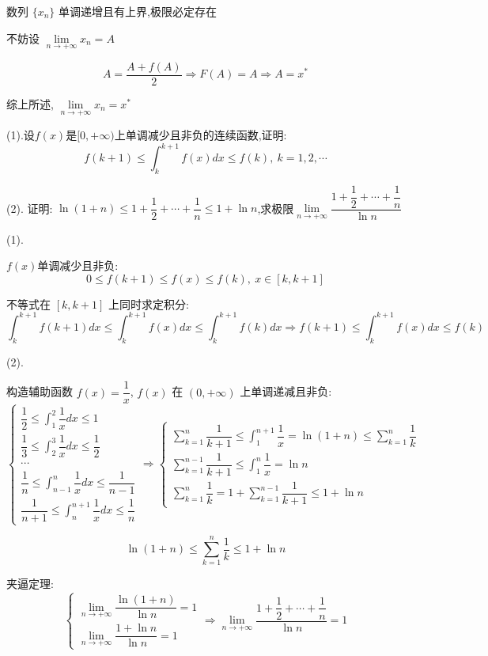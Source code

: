\begin{solution}
	数列 $\{x_{n}\}$ 单调递增且有上界,极限必定存在
	
	不妨设 $\lim\limits_{n\to +\infty}x_{n} = A$
	
	$$A=\dfrac{A+f(A)}{2}\Rightarrow F(A)=A\Rightarrow A=x^{*}$$
	
	综上所述, $\lim\limits_{n\to+\infty}x_{n}=x^{*}$
\end{solution}
\begin{proposition}
(1).设$f(x)$是$[0,+\infty)$上单调减少且非负的连续函数,证明:  $$f(k+1)\leq \int_{k}^{k+1}f(x)dx\leq f(k),\ k=1,2,\cdots$$

(2). 证明:  $\ln(1+n)\leq 1+\dfrac{1}{2}+\cdots+\dfrac{1}{n}\leq 1+\ln n$,求极限$\lim\limits_{n\to+\infty}\dfrac{1+\dfrac{1}{2}+\cdots+\dfrac{1}{n}}{\ln n}$

\end{proposition}
\begin{solution}
	
	(1). 
	
	$f(x)$单调减少且非负:  
	$$0\leq f(k+1)\leq f(x)\leq f(k),\ x\in[k,k+1]$$
	
	不等式在 $[k,k+1]$ 上同时求定积分:  
	$$\int_{k}^{k+1}f(k+1)dx\leq \int_{k}^{k+1}f(x)dx\leq \int_{k}^{k+1}f(k)dx\Rightarrow f(k+1)\leq \int_{k}^{k+1}f(x)dx\leq f(k)$$
	
	(2). 
	
	构造辅助函数 $f(x)=\dfrac{1}{x}$, $f(x)$ 在 $(0,+\infty)$ 上单调递减且非负:  
	$$\begin{cases}
		\displaystyle{\dfrac{1}{2}\leq \int_{1}^{2}\dfrac{1}{x}dx\leq 1} \\
		\displaystyle{\dfrac{1}{3}\leq \int_{2}^{3}\dfrac{1}{x}dx\leq \dfrac{1}{2}} \\
		\cdots\\
		\displaystyle{\dfrac{1}{n}\leq \int_{n-1}^{n}\dfrac{1}{x}dx\leq \dfrac{1}{n-1}}\\
		\displaystyle{\dfrac{1}{n+1}\leq \int_{n}^{n+1}\dfrac{1}{x}dx\leq \dfrac{1}{n}}
	\end{cases} \Rightarrow
	\begin{cases}
		\displaystyle{\sum\limits_{k=1}^{n}\dfrac{1}{k+1}\leq \int_{1}^{n+1}\dfrac{1}{x}=\ln(1+n)\leq \sum\limits_{k=1}^{n}\dfrac{1}{k}}\\
		\displaystyle{\sum\limits_{k=1}^{n-1}\dfrac{1}{k+1}\leq \int_{1}^{n}\dfrac{1}{x}=\ln n}\\
		\displaystyle{\sum\limits_{k=1}^{n}\dfrac{1}{k}=1+\sum\limits_{k=1}^{n-1}\dfrac{1}{k+1}\leq 1+\ln n}
	\end{cases}$$
	
	$$\ln(1+n)\leq \sum\limits_{k=1}^{n}\dfrac{1}{k}\leq 1+\ln n$$

	夹逼定理:  
	$$\begin{cases}
		\lim\limits_{n\to +\infty}\dfrac{\ln(1+n)}{\ln n} = 1\\
		\lim\limits_{n\to +\infty}\dfrac{1+\ln n}{\ln n} = 1
	\end{cases}\Rightarrow 
	\lim\limits_{n\to +\infty}\dfrac{1+\dfrac{1}{2}+\cdots+\dfrac{1}{n}}{\ln n}=1$$
\end{solution}

